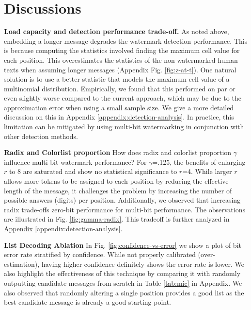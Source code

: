 \section{Discussions}\label{sec:discussion}
\vspace{-3mm}
\textbf{Load capacity and detection performance trade-off.} As noted above, embedding a longer message degrades the watermark detection performance. This is because computing the statistics involved finding the maximum cell value for each position. This overestimates the statistics of the non-watermarked human texts when assuming longer messages (Appendix Fig. \ref{fig:z-at-t}). One natural solution is to use a better statistic that models the maximum cell value of a multinomial distribution. Empirically, we found that this performed on par or even slightly worse compared to the current approach, which may be due to the approximation error when using a small sample size. We give a more detailed discussion on this in Appendix \ref{appendix:detection-analysis}. In practice, this limitation can be mitigated by using multi-bit watermarking in conjunction with other detection methods.  


\noindent\textbf{Radix and Colorlist proportion} 
How does radix and colorlist proportion $\gamma$ influence multi-bit watermark performance? For $\gamma$=.125, the benefits of enlarging $r$ to 8 are saturated and show no statistical significance to $r$=4. While larger $r$ allows more tokens to be assigned to each position by reducing the effective length of the message, it challenges the problem by increasing the number of possible answers (digits) per position. Additionally, we observed that increasing radix trade-offs zero-bit performance for multi-bit performance. The observations are illustrated in Fig. \ref{fig:gamma-radix}. This tradeoff is further analyzed in Appendix \ref{appendix:detection-analysis}.

\noindent\textbf{List Decoding Ablation}
In Fig. \ref{fig:confidence-vs-error} we show a plot of bit error rate stratified by confidence. While not properly calibrated (over-estimation), having higher confidence definitely shows the error rate is lower. 
We also highlight the effectiveness of this technique by comparing it with randomly outputting candidate messages from scratch in Table \ref{tab:mic} in Appendix. We also observed that randomly altering a single position provides a good list as the best candidate message is already a good starting point. 